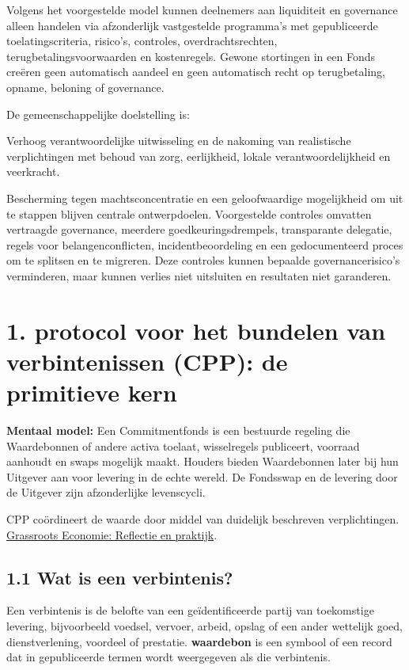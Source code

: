 \documentclass[11pt]{article}
\begin{document}
Volgens het voorgestelde model kunnen deelnemers aan liquiditeit en governance alleen handelen via afzonderlijk vastgestelde programma's met gepubliceerde toelatingscriteria, risico's, controles, overdrachtsrechten, terugbetalingsvoorwaarden en kostenregels. Gewone stortingen in een Fonds creëren geen automatisch aandeel en geen automatisch recht op terugbetaling, opname, beloning of governance.

De gemeenschappelijke doelstelling is:

Verhoog verantwoordelijke uitwisseling en de nakoming van realistische verplichtingen met behoud van zorg, eerlijkheid, lokale verantwoordelijkheid en veerkracht.

Bescherming tegen machtsconcentratie en een geloofwaardige mogelijkheid om uit te stappen blijven centrale ontwerpdoelen. Voorgestelde controles omvatten vertraagde governance, meerdere goedkeuringsdrempels, transparante delegatie, regels voor belangenconflicten, incidentbeoordeling en een gedocumenteerd proces om te splitsen en te migreren. Deze controles kunnen bepaalde governancerisico's verminderen, maar kunnen verlies niet uitsluiten en resultaten niet garanderen.


\section*{1. protocol voor het bundelen van verbintenissen (CPP): de primitieve kern}

\textbf{Mentaal model:} Een Commitmentfonds is een bestuurde regeling die Waardebonnen of andere activa toelaat, wisselregels publiceert, voorraad aanhoudt en swaps mogelijk maakt. Houders bieden Waardebonnen later bij hun Uitgever aan voor levering in de echte wereld. De Fondsswap en de levering door de Uitgever zijn afzonderlijke levenscycli.

CPP coördineert de waarde door middel van duidelijk beschreven verplichtingen. \href{https://willruddick.substack.com/p/grassroots-economics-the-book-is}{Grassroots Economie: Reflectie en praktijk}.

\subsection*{1.1 Wat is een verbintenis?}

Een verbintenis is de belofte van een geïdentificeerde partij van toekomstige levering, bijvoorbeeld voedsel, vervoer, arbeid, opslag of een ander wettelijk goed, dienstverlening, voordeel of prestatie. \textbf{waardebon} is een symbool of een record dat in gepubliceerde termen wordt weergegeven als die verbintenis.
\end{document}
